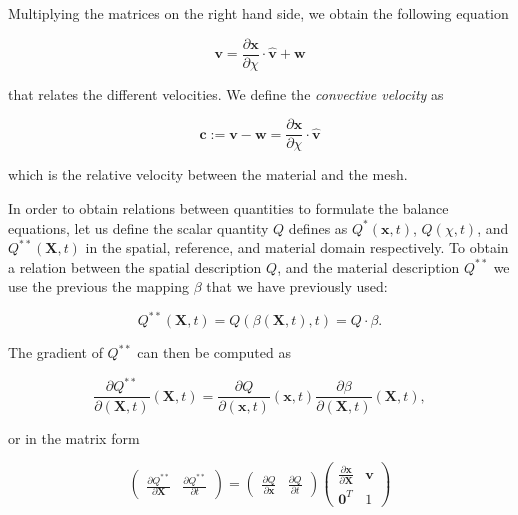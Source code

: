 \documentclass[a4paper,11pt,openright,twoside]{book}
\begin{document}
Multiplying the matrices on the right hand side, we obtain the following equation

\begin{equation}
\mathbf{v} = \frac{\partial \mathbf{x}}{\partial \chi} \cdot \hat{\mathbf{v}} + \mathbf{w}
\end{equation}

that relates the different velocities. We define the \emph{convective velocity} as

\begin{equation}
\mathbf{c} := \mathbf{v-w} = \frac{\partial \mathbf{x}}{\partial \chi} \cdot \hat{\mathbf{v}}
\end{equation}

which is the relative velocity between the material and the mesh.

In order to obtain relations between quantities to formulate the balance equations, let us define the scalar quantity $Q$ defines as $Q^{*}(\mathbf{x},t)$, $Q(\chi,t)$, and $Q^{**}(\mathbf{X},t)$ in the spatial, reference, and material domain respectively.
To obtain a relation between the spatial description $Q$, and the material description $Q^{**}$ we use the previous the mapping $\beta$ that we have previously used:

\begin{equation}
Q^{**}(\mathbf{X},t) = Q(\beta(\mathbf{X},t),t) = Q \cdot \beta.
\end{equation}

The gradient of $Q^{**}$ can then be computed as

\begin{equation}
\label{eq:ale:1}
\frac{\partial Q^{**}}{\partial (\mathbf{X}, t)} (\mathbf{X},t) = 
\frac{\partial Q}{\partial (\mathbf{x}, t)} (\mathbf{x},t)
\frac{\partial \beta}{\partial (\mathbf{X}, t)} (\mathbf{X},t),
\end{equation}

or in the matrix form

\begin{equation}
\label{eq:ale:2}
\begin{pmatrix}
\frac{\partial Q^{**}}{\partial \mathbf{X}} & \frac{\partial Q^{**}}{\partial t}
\end{pmatrix} = 
\begin{pmatrix}
\frac{\partial Q}{\partial \mathbf{x}} & \frac{\partial Q}{\partial t}
\end{pmatrix}
\begin{pmatrix}
\frac{\partial \mathbf{x}}{\partial \mathbf{X}} & \mathbf{v}\\
\mathbf{0}^T & 1
\end{pmatrix} 
\end{equation}
\end{document}
